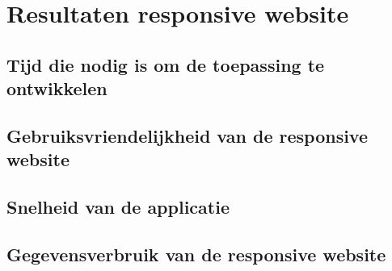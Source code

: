 \chapter{Resultaten responsive website}
\label{ch:resultatenresponsivewebsite}
\section{Tijd die nodig is om de toepassing te ontwikkelen}

\section{Gebruiksvriendelijkheid van de responsive website}

\section{Snelheid van de applicatie}

\section{Gegevensverbruik van de responsive website}
